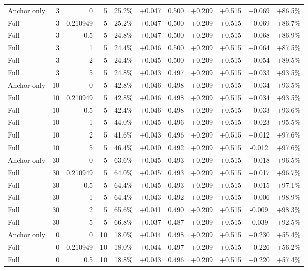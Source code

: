 \begin{table}[htbp]
\begin{tabular}{lrrrccccccc}
Anchor only & 3 & 0 & 5 & 25.2\% & +0.047 & 0.500 & +0.209 & +0.515 & +0.069 & +86.5\% \\
Full & 3 & 0.210949 & 5 & 25.2\% & +0.047 & 0.500 & +0.209 & +0.515 & +0.069 & +86.7\% \\
Full & 3 & 0.5 & 5 & 24.8\% & +0.047 & 0.500 & +0.209 & +0.515 & +0.068 & +86.9\% \\
Full & 3 & 1 & 5 & 24.4\% & +0.046 & 0.500 & +0.209 & +0.515 & +0.064 & +87.5\% \\
Full & 3 & 2 & 5 & 24.4\% & +0.045 & 0.500 & +0.209 & +0.515 & +0.054 & +89.5\% \\
Full & 3 & 5 & 5 & 24.8\% & +0.043 & 0.497 & +0.209 & +0.515 & +0.033 & +93.5\% \\
Anchor only & 10 & 0 & 5 & 42.8\% & +0.046 & 0.498 & +0.209 & +0.515 & +0.034 & +93.5\% \\
Full & 10 & 0.210949 & 5 & 42.8\% & +0.046 & 0.498 & +0.209 & +0.515 & +0.034 & +93.5\% \\
Full & 10 & 0.5 & 5 & 42.4\% & +0.046 & 0.498 & +0.209 & +0.515 & +0.033 & +93.6\% \\
Full & 10 & 1 & 5 & 44.0\% & +0.045 & 0.496 & +0.209 & +0.515 & +0.023 & +95.5\% \\
Full & 10 & 2 & 5 & 41.6\% & +0.043 & 0.496 & +0.209 & +0.515 & +0.012 & +97.6\% \\
Full & 10 & 5 & 5 & 46.4\% & +0.040 & 0.492 & +0.209 & +0.515 & -0.012 & +97.6\% \\
Anchor only & 30 & 0 & 5 & 63.6\% & +0.045 & 0.493 & +0.209 & +0.515 & +0.018 & +96.5\% \\
Full & 30 & 0.210949 & 5 & 64.0\% & +0.045 & 0.493 & +0.209 & +0.515 & +0.017 & +96.7\% \\
Full & 30 & 0.5 & 5 & 64.4\% & +0.045 & 0.493 & +0.209 & +0.515 & +0.015 & +97.1\% \\
Full & 30 & 1 & 5 & 64.4\% & +0.043 & 0.492 & +0.209 & +0.515 & +0.006 & +98.9\% \\
Full & 30 & 2 & 5 & 65.6\% & +0.041 & 0.490 & +0.209 & +0.515 & -0.009 & +98.3\% \\
Full & 30 & 5 & 5 & 66.8\% & +0.037 & 0.487 & +0.209 & +0.515 & -0.039 & +92.5\% \\
Anchor only & 0 & 0 & 10 & 18.0\% & +0.044 & 0.498 & +0.209 & +0.515 & +0.230 & +55.4\% \\
Full & 0 & 0.210949 & 10 & 18.0\% & +0.044 & 0.497 & +0.209 & +0.515 & +0.226 & +56.2\% \\
Full & 0 & 0.5 & 10 & 18.8\% & +0.043 & 0.496 & +0.209 & +0.515 & +0.220 & +57.4\% \\

\end{tabular}
\end{table}
